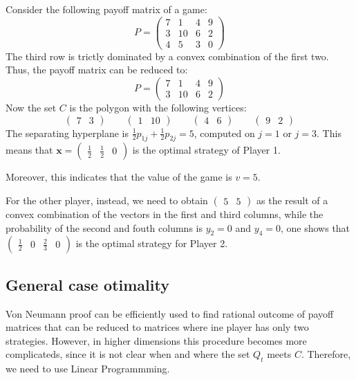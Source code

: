 \begin{example}
    Consider the following payoff matrix of a game: 
    \[P=\begin{pmatrix} 7 & 1 & 4 & 9 \\ 3 & 10 & 6 & 2 \\ 4 & 5 & 3 & 0 \end{pmatrix}\]
    The third row is trictly dominated by a convex combination of the first two. 
    Thus, the payoff matrix can be reduced to: 
    \[P=\begin{pmatrix} 7 & 1 & 4 & 9 \\ 3 & 10 & 6 & 2 \end{pmatrix}\]
    Now the set $C$ is the polygon with the following vertices: 
    \[\begin{pmatrix} 7 & 3 \end{pmatrix}\qquad\begin{pmatrix} 1 & 10 \end{pmatrix}\qquad\begin{pmatrix} 4 & 6 \end{pmatrix}\qquad\begin{pmatrix} 9 & 2 \end{pmatrix}\]
    The separating hyperplane is $\frac{1}{2}p_{1j}+\frac{1}{2}p_{2j}=5$, computed on $j=1$ or $j=3$.
    This means that $\mathbf{x}=\begin{pmatrix} \frac{1}{2} & \frac{1}{2} & 0 \end{pmatrix}$ is the optimal strategy of Player 1. 

    Moreover, this indicates that the value of the game is $v=5$. 

    For the other player, instead, we need to obtain $\begin{pmatrix} 5 & 5 \end{pmatrix}$ as the result of a convex combination of the vectors in the first and third columns, while the probability of the second and fouth columns is $y_2=0$ and $y_4=0$, one shows that $\begin{pmatrix} \frac{1}{2} & 0 & \frac{2}{3} & 0 \end{pmatrix}$ is the optimal strategy for Player 2.
\end{example}

\subsection{General case otimality}
Von Neumann proof can be efficiently used to find rational outcome of payoff matrices that can be reduced to matrices where ine player has only two strategies. 
However, in higher dimensions this procedure becomes more complicateds, since it is not clear when and where the set $Q_t$ meets $C$. 
Therefore, we need to use Linear Programmming. 

